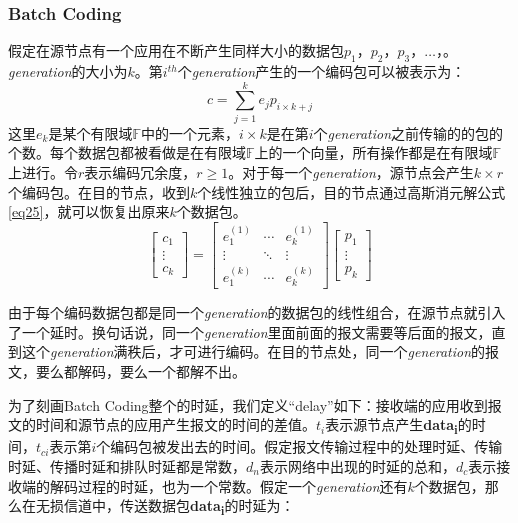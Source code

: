 \subsubsection[Batch Coding]{\textbf{Batch Coding}}
\par
假定在源节点有一个应用在不断产生同样大小的数据包\emph{$p_{1}$}，\emph{$p_{2}$}，\emph{$p_{3}$}，$\dots$，。\emph{generation}的大小为$k$。第$i^{th}$个\emph{generation}产生的一个编码包可以被表示为：
\begin{equation}\label{eq24}
c = \sum\limits_{j = 1}^k {{e_j}{p_{i \times k + j}}}
\end{equation}
这里$e_{k}$是某个有限域$\mathbb{F}$中的一个元素，$i \times k$是在第$i$个\emph{generation}之前传输的的包的个数。每个数据包都被看做是在有限域$\mathbb{F}$上的一个向量，所有操作都是在有限域$\mathbb{F}$上进行。令$r$表示编码冗余度，$r  \ge 1$。对于每一个\emph{generation}，源节点会产生$k \times r$个编码包。在目的节点，收到$k$个线性独立的包后，目的节点通过高斯消元解公式\ref{eq25}，就可以恢复出原来$k$个数据包。
\begin{equation}\label{eq25}
\left[ {\begin{array}{*{20}{c}}
	{{c_1}}\\
	\vdots \\
	{{c_k}}
	\end{array}} \right] = \left[ {\begin{array}{*{20}{c}}
	{e_1^{\left( 1 \right)}}& \cdots &{e_k^{\left( 1 \right)}}\\
	\vdots & \ddots & \vdots \\
	{e_1^{\left( k \right)}}& \cdots &{e_k^{\left( k \right)}}
	\end{array}} \right]\left[ {\begin{array}{*{20}{c}}
	{{p_1}}\\
	\vdots \\
	{{p_k}}
	\end{array}} \right]
\end{equation}
\par
由于每个编码数据包都是同一个\emph{generation}的数据包的线性组合，在源节点就引入了一个延时。换句话说，同一个\emph{generation}里面前面的报文需要等后面的报文，直到这个\emph{generation}满秩后，才可进行编码。在目的节点处，同一个\emph{generation}的报文，要么都解码，要么一个都解不出。
\par
为了刻画Batch Coding整个的时延，我们定义“delay”如下：接收端的应用收到报文的时间和源节点的应用产生报文的时间的差值。$t_{i}$表示源节点产生{\textbf{data}}\textsubscript{\textbf{i}}的时间，$t_{ci}$表示第$i$个编码包被发出去的时间。假定报文传输过程中的处理时延、传输时延、传播时延和排队时延都是常数，$d_{n}$表示网络中出现的时延的总和，$d_{c}$表示接收端的解码过程的时延，也为一个常数。假定一个\emph{generation}还有$k$个数据包，那么在无损信道中，传送数据包{\textbf{data}}\textsubscript{\textbf{i}}的时延为：
